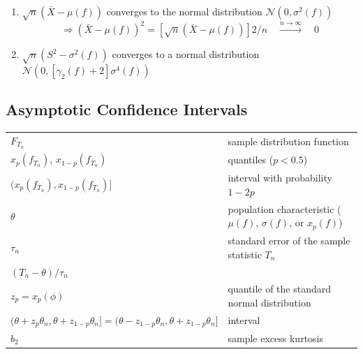 \begin{enumerate}
\begin{enumerate}
        \item $\sqrt{n}(\bar{X} - \mu( f ))$ converges to the normal distribution $\mathcal{N}(0, \sigma^2( f ))$
        \[
            \Rightarrow
            (\bar{X} - \mu( f ))^2 
            = [\sqrt{n}(\bar{X} - \mu( f ))]2/n 
            \quad
            \overset{n\to \infty}{\longrightarrow}
            \quad
            0
        \]

        \item $\sqrt{n}(S^2 - \sigma^2( f ))$ converges to a normal distribution $\mathcal{N}(0,[\gamma_2( f ) + 2]\sigma^4( f ))$
    \end{enumerate}

    
\end{enumerate}

\subsection{Asymptotic Confidence Intervals \cite{ism-1}} \label{sample statistic: Asymptotic Confidence Intervals}

\renewcommand{\arraystretch}{1.3}
\begin{longtable}[H]{l l}
    $F_{T_n}$ & sample distribution function \\

    $x_p( f_{T_n} )$, $x_{1-p}( f_{T_n} )$ & quantiles ($p < 0.5$)\\

    $(x_p( f_{T_n} ), x_{1-p}( f_{T_n} )]$ & interval with probability $1 - 2p$\\

    $\theta$ & population characteristic ($\mu( f )$, $\sigma ( f )$, or $x_p( f )$)\\

    $\tau_n$ & standard error of the sample statistic $T_n$ \\

    $(T_n - \theta )/\tau_n$ & \\

    $z_p = x_p (\phi)$ & quantile of the standard normal distribution\\

    $(\theta + z_p\theta_n, \theta + z_{1-p}\theta_n] = (\theta - z_{1-p}\theta_n, \theta + z_{1-p}\theta_n]$ & interval\\

    $b_2$ & sample excess kurtosis\\
\end{longtable}



